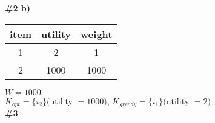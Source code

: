 \documentclass{article}
\begin{document}
\textbf{\#2 b)}\\
\begin{tabular}{|c|c|c| }
 \hline
 item & utility & weight \\
 \hline
 1 & 2 & 1 \\
 \hline
 2 & 1000 & 1000\\
 \hline
\end{tabular}
$W = 1000$
\\$K_{opt} = \{i_2\} ($utility $= 1000)$, $K_{greedy} = \{i_1\} ($utility $= 2)$\\
\textbf{\#3}\\
\end{document}
